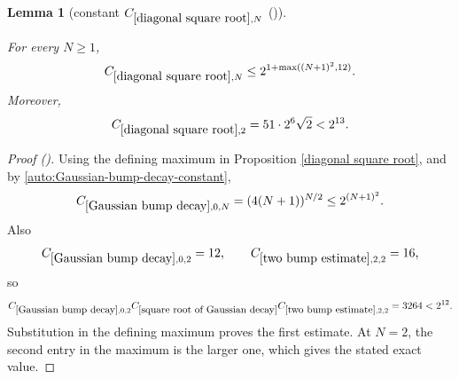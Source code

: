 \documentclass[12pt,reqno]{amsart}
\newcommand{\auto}{{({\tiny\faCar})}}
\theoremstyle{plain}
\newtheorem{lemma}[theorem]{Lemma}
\numberwithin{equation}{section}
\theoremstyle{remark}
\newcommand{\uses}[1]{}
\newcommand{\usesdefs}[1]{}
\newcommand{\leanok}{}
\newcommand{\lean}[1]{}
\begin{document}
\begin{lemma}[constant $C_{\ref{diagonal square root},N}$ \auto]\label{constant diagonal square root}\uses{Gaussian bump decay,two bump estimate,square root of Gaussian decay,diagonal square root}\usesdefs{}
\lean{Auto.constantDiagonalSquareRoot}
\leanok
For every $N\ge1$,
\begin{equation}\label{constant diagonal square root bound}
C_{\ref{diagonal square root},N}
\le2^{1+\max((N+1)^2,12)}.
\end{equation}
Moreover,
\begin{equation}\label{auto:constant-diagonal-square-root-two}
C_{\ref{diagonal square root},2}=51\cdot2^6\sqrt2<2^{13}.
\end{equation}
\end{lemma}
\begin{proof}[Proof \auto]
Using the defining maximum in Proposition \ref{diagonal square root}, and by \eqref{auto:Gaussian-bump-decay-constant},
\[
C_{\ref{Gaussian bump decay},0,N}
=(4(N+1))^{N/2}
\le2^{(N+1)^2}.
\]
Also
\[
C_{\ref{Gaussian bump decay},0,2}=12,
\qquad
C_{\ref{two bump estimate},2,2}=16,
\]
so
\[
C_{\ref{Gaussian bump decay},0,2}
C_{\ref{square root of Gaussian decay}}
C_{\ref{two bump estimate},2,2}
=3264<2^{12}.
\]
Substitution in the defining maximum proves the first estimate. At $N=2$, the second entry in the maximum is the larger one, which gives the stated exact value.
\end{proof}
\end{document}

